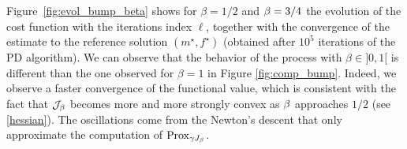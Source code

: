 Figure~\ref{fig:evol_bump_beta} shows for $\beta = 1/2$ and $\beta = 3/4$ the evolution of the cost function with the iterations index $\ell$, together with the convergence of the estimate to the reference solution $(m^\star,f^\star)$ (obtained after $10^5$ iterations of the PD algorithm). We can observe that the behavior of the process with $\beta \in ]0,1[$ is different than the one observed for $\beta=1$ in Figure \ref{fig:comp_bump}. Indeed, we observe a faster convergence of the functional value, which is consistent with the fact that $\mathcal{J}_\beta$ becomes more and more strongly convex as $\beta$ approaches $1/2$ (see \eqref{hessian}). The oscillations come from the Newton's descent that only approximate the computation of $\operatorname{Prox}_{\gamma J_\beta}$.

\renewcommand{\sidecap}[1]{ {\begin{sideways}\parbox{4cm}{\centering #1}\end{sideways}} }

